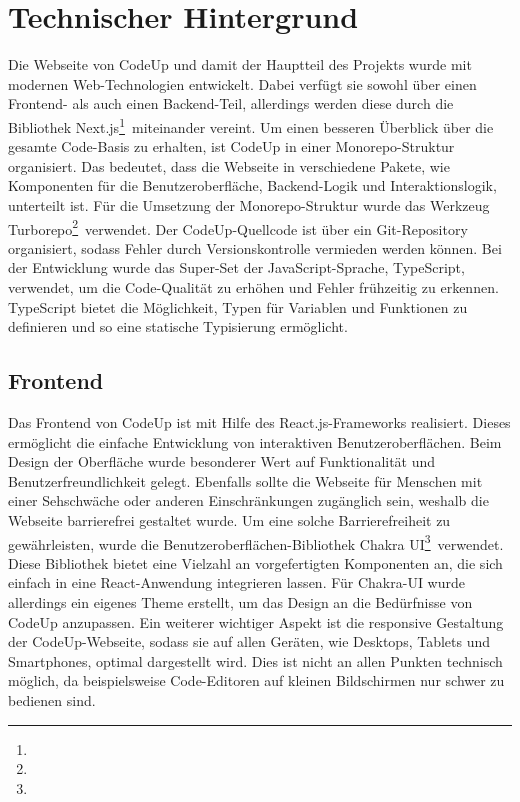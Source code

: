 \documentclass[main.tex]{subfiles}
\begin{document}
    \section{Technischer Hintergrund}
    Die Webseite von CodeUp und damit der Hauptteil des Projekts wurde mit modernen Web-Technologien entwickelt.
    Dabei verfügt sie sowohl über einen Frontend- als auch einen Backend-Teil, allerdings werden diese durch die Bibliothek \dq Next.js\dq \footnote{}\ miteinander vereint.
    Um einen besseren Überblick über die gesamte Code-Basis zu erhalten, ist CodeUp in einer Monorepo-Struktur organisiert.
    Das bedeutet, dass die Webseite in verschiedene Pakete, wie Komponenten für die Benutzeroberfläche, Backend-Logik und Interaktionslogik, unterteilt ist.
    Für die Umsetzung der Monorepo-Struktur wurde das Werkzeug \dq Turborepo\dq \footnote{}\ verwendet.
    Der CodeUp-Quellcode ist über ein Git-Repository organisiert, sodass Fehler durch Versionskontrolle vermieden werden können.
    Bei der Entwicklung wurde das Super-Set der JavaScript-Sprache, TypeScript, verwendet, um die Code-Qualität zu erhöhen und Fehler frühzeitig zu erkennen.
    TypeScript bietet die Möglichkeit, Typen für Variablen und Funktionen zu definieren und so eine statische Typisierung ermöglicht.
    \subsection{Frontend}
    Das Frontend von CodeUp ist mit Hilfe des React.js-Frameworks realisiert.
    Dieses ermöglicht die einfache Entwicklung von interaktiven Benutzeroberflächen.
    Beim Design der Oberfläche wurde besonderer Wert auf Funktionalität und Benutzerfreundlichkeit gelegt.
    Ebenfalls sollte die Webseite für Menschen mit einer Sehschwäche oder anderen Einschränkungen zugänglich sein, weshalb die Webseite barrierefrei gestaltet wurde.
    Um eine solche Barrierefreiheit zu gewährleisten, wurde die Benutzeroberflächen-Bibliothek \dq Chakra UI\dq \footnote{}\ verwendet.
    Diese Bibliothek bietet eine Vielzahl an vorgefertigten Komponenten an, die sich einfach in eine React-Anwendung integrieren lassen.
    Für Chakra-UI wurde allerdings ein eigenes Theme erstellt, um das Design an die Bedürfnisse von CodeUp anzupassen.
    Ein weiterer wichtiger Aspekt ist die responsive Gestaltung der CodeUp-Webseite, sodass sie auf allen Geräten, wie Desktops, Tablets und Smartphones, optimal dargestellt wird.
    Dies ist nicht an allen Punkten technisch möglich, da beispielsweise Code-Editoren auf kleinen Bildschirmen nur schwer zu bedienen sind.
\end{document}
